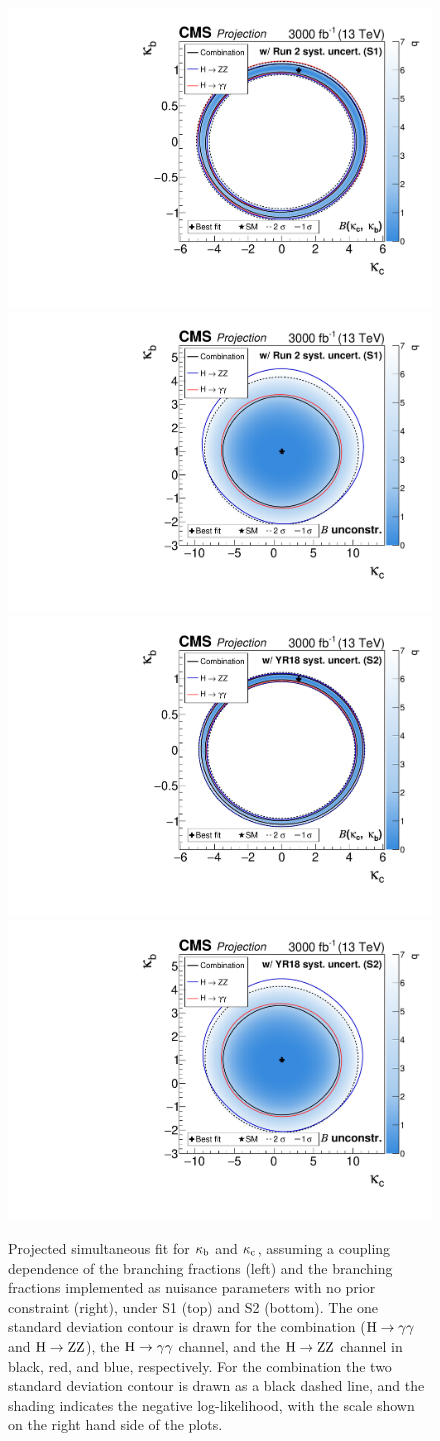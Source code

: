 \begin{figure}[hbtp]
\begin{center}
{        }{
        \includegraphics[width=0.49\linewidth]{img/projections/projection_kbkc_plot_couplingdependentBRs.pdf}
        \includegraphics[width=0.49\linewidth]{img/projections/projection_kbkc_plot_floatingBRs.pdf}
        \includegraphics[width=0.49\linewidth]{img/projections/projection_kbkc_plot_couplingdependentBRs_scenario2.pdf}
        \includegraphics[width=0.49\linewidth]{img/projections/projection_kbkc_plot_floatingBRs_scenario2.pdf}
        }
    \caption{
        Projected simultaneous fit for $\kappa_{\mathrm{b}}$ and $\kappa_{\mathrm{c}}$, assuming a coupling dependence of the branching fractions (left) and the branching fractions implemented as nuisance parameters with no prior constraint (right), under S1 (top) and S2 (bottom).
        The one standard deviation contour is drawn for the combination ($\mathrm{H}\to\mathrm{\gamma}\mathrm{\gamma}$ and $\mathrm{H}\to\mathrm{Z}\mathrm{Z}$), the $\mathrm{H}\to\mathrm{\gamma}\mathrm{\gamma}$ channel, and the $\mathrm{H}\to\mathrm{Z}\mathrm{Z}$ channel in black, red, and blue, respectively.
        For the combination the two standard deviation contour is drawn as a black dashed line, and the shading indicates the negative log-likelihood, with the scale shown on the right hand side of the plots.
        }
    \label{fig:proj_kbkc}
  \end{center}
\end{figure}


